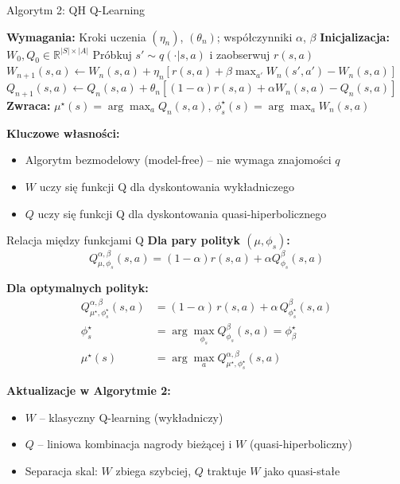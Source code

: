 \begin{frame}{Algorytm 2: QH Q-Learning}
\begin{algorithm}[H]
\caption{Uczenie optymalnej polityki dla QH \cite{eshwar2025}}
\label{alg:qh-qlearning-defense}
\begin{algorithmic}[1]
\small
\STATE \textbf{Wymagania:} Kroki uczenia $(\eta_n)$, $(\theta_n)$; współczynniki $\alpha$, $\beta$
\STATE \textbf{Inicjalizacja:} $W_0, Q_0 \in \mathbb{R}^{|S| \times |A|}$
\STATE Próbkuj $s' \sim q(\cdot|s, a)$ i zaobserwuj $r(s, a)$
\STATE $W_{n+1}(s, a) \leftarrow W_n(s, a) + \eta_n \left[ r(s, a) + \beta \max_{a'} W_n(s', a') - W_n(s, a) \right]$
\STATE $Q_{n+1}(s, a) \leftarrow Q_n(s, a) + \theta_n \left[ (1 - \alpha) r(s, a) + \alpha W_n(s, a) - Q_n(s, a) \right]$
\ENDFOR
\ENDFOR
\STATE \textbf{Zwraca:} $\mu^\star(s) = \arg\max_a Q_n(s, a)$, $\phi_s^\star(s) = \arg\max_a W_n(s, a)$
\end{algorithmic}
\end{algorithm}

\vspace{0.3em}
\textbf{Kluczowe własności:}
\begin{itemize}
    \item Algorytm bezmodelowy (model-free) -- nie wymaga znajomości $q$
    \item $W$ uczy się funkcji Q dla dyskontowania wykładniczego
    \item $Q$ uczy się funkcji Q dla dyskontowania quasi-hiperbolicznego
\end{itemize}
\end{frame}

\begin{frame}{Relacja między funkcjami Q}
\textbf{Dla pary polityk $(\mu, \phi_s)$:}
\[
Q^{\alpha, \beta}_{\mu, \phi_s}(s,a) = (1-\alpha) r(s,a) + \alpha Q^{\beta}_{\phi_s}(s,a)
\]

\vspace{0.5em}
\textbf{Dla optymalnych polityk:}
\begin{align*}
Q^{\alpha,\beta}_{\mu^\star,\phi_s^\star}(s,a) &= (1-\alpha)\,r(s,a) + \alpha\,Q^{\beta}_{\phi_s^\star}(s,a) \\
\phi_s^\star &= \arg\max_{\phi_s} Q^{\beta}_{\phi_s}(s,a) = \phi_\beta^\star \\
\mu^\star(s) &= \arg\max_a Q^{\alpha, \beta}_{\mu^\star, \phi_s^\star}(s,a)
\end{align*}

\vspace{0.5em}
\textbf{Aktualizacje w Algorytmie 2:}
\begin{itemize}
    \item $W$ -- klasyczny Q-learning (wykładniczy)
    \item $Q$ -- liniowa kombinacja nagrody bieżącej i $W$ (quasi-hiperboliczny)
    \item Separacja skal: $W$ zbiega szybciej, $Q$ traktuje $W$ jako quasi-stałe
\end{itemize}
\end{frame}


